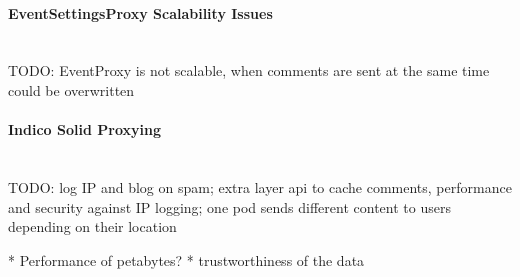 \paragraph{EventSettingsProxy Scalability Issues}\mbox{}\\

TODO: EventProxy is not scalable, when comments are sent at the same time could be overwritten
\vspace{0.5cm}
\paragraph{Indico Solid Proxying}\mbox{}\\

TODO: log IP and blog on spam; extra layer api to cache comments, performance and security against IP logging; one pod sends different content to users depending on their location

* Performance of petabytes?
* trustworthiness of the data